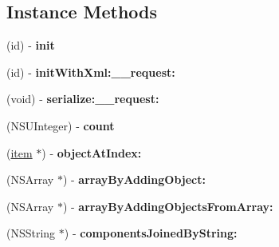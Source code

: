 \subsection*{Instance Methods}
\begin{DoxyCompactItemize}
\item 
\hypertarget{interfaceget_items_by_batch_response_ad32bbe047c09f08ce811b12909fa7c0e}{}(id) -\/ {\bfseries init}\label{interfaceget_items_by_batch_response_ad32bbe047c09f08ce811b12909fa7c0e}

\item 
\hypertarget{interfaceget_items_by_batch_response_a39cf5729b52c816dc9412b2c8a89ce1e}{}(id) -\/ {\bfseries init\+With\+Xml\+:\+\_\+\+\_\+request\+:}\label{interfaceget_items_by_batch_response_a39cf5729b52c816dc9412b2c8a89ce1e}

\item 
\hypertarget{interfaceget_items_by_batch_response_ab8561123fa7d7296445c836b3dc2f0fb}{}(void) -\/ {\bfseries serialize\+:\+\_\+\+\_\+request\+:}\label{interfaceget_items_by_batch_response_ab8561123fa7d7296445c836b3dc2f0fb}

\item 
\hypertarget{interfaceget_items_by_batch_response_a0af8b08a08aa47e5f22107b5948651b4}{}(N\+S\+U\+Integer) -\/ {\bfseries count}\label{interfaceget_items_by_batch_response_a0af8b08a08aa47e5f22107b5948651b4}

\item 
\hypertarget{interfaceget_items_by_batch_response_aafc290e3cb830b1e13c319c40b351382}{}(\hyperlink{interfaceitem}{item} $\ast$) -\/ {\bfseries object\+At\+Index\+:}\label{interfaceget_items_by_batch_response_aafc290e3cb830b1e13c319c40b351382}

\item 
\hypertarget{interfaceget_items_by_batch_response_af027c8bd3b26071f25bd9b910e5aeeb5}{}(N\+S\+Array $\ast$) -\/ {\bfseries array\+By\+Adding\+Object\+:}\label{interfaceget_items_by_batch_response_af027c8bd3b26071f25bd9b910e5aeeb5}

\item 
\hypertarget{interfaceget_items_by_batch_response_a581be9dd99d116d39b21a2198e40d9d4}{}(N\+S\+Array $\ast$) -\/ {\bfseries array\+By\+Adding\+Objects\+From\+Array\+:}\label{interfaceget_items_by_batch_response_a581be9dd99d116d39b21a2198e40d9d4}

\item 
\hypertarget{interfaceget_items_by_batch_response_a1838a3302a43eb5f0db1c72809fc0569}{}(N\+S\+String $\ast$) -\/ {\bfseries components\+Joined\+By\+String\+:}\label{interfaceget_items_by_batch_response_a1838a3302a43eb5f0db1c72809fc0569}


\end{DoxyCompactItemize}

